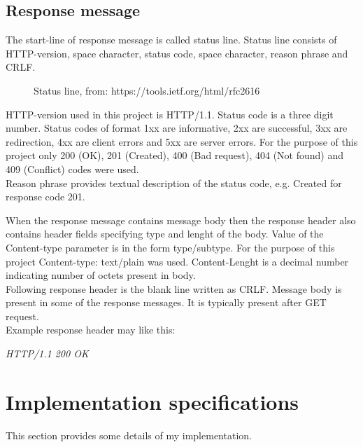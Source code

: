 \documentclass[11pt, a4paper]{article}
\begin{document}
	\subsection{Response message}
	The start-line of response message is called status line. \cite{Fiel:rfc7230} Status line consists of HTTP-version, space character, status code, space character, reason phrase and CRLF. \\
	\begin{figure}[h]
			\centering
			\caption{Status line, from: https://tools.ietf.org/html/rfc2616}
			\label{obrazok1}
	\end{figure}
	\hfill \break	
	HTTP-version used in this project is HTTP/1.1.
	\newpage
	Status code is a three digit number. Status codes of format 1xx are informative, 2xx are successful, 3xx are redirection, 4xx are client errors and 5xx are server
	errors. For the purpose of this project only 200 (OK), 201 (Created), 400 (Bad request), 404 (Not found) and 409 (Conflict) codes were used. \\
	Reason phrase provides textual description of the status code, e.g. Created for response code 201. \hfill \break
	
	When the response message contains message body then the response header also contains header fields specifying type and lenght of the body.
	 \cite{Fiel:rfc2616} Value of the Content-type parameter is in the form type/subtype. For the purpose 		of this project Content-type: text/plain was used. Content-Lenght is a decimal number indicating number of octets present in body. \\
	Following response header is the blank line written as CRLF. Message body is present in some of the response messages. It is typically present after GET request. \\
	Example response header may like this: \\ 
	\begin{center} 
	\textit{HTTP/1.1 200 OK \\ }
	\end{center}
	\section{Implementation specifications}
	This section provides some details of my implementation. 
\end{document}

